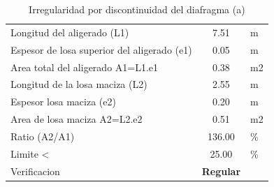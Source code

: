 \documentclass[12pt]{article}
\begin{document}
\begin{table}[h!]
  \centering
  \caption{Irregularidad por discontinuidad del diafragma (a)}
    \begin{tabular}{|ll|c|r}
\cline{1-3}    \multicolumn{2}{|l|}{Longitud del aligerado (L1)} & 7.51 & \multicolumn{1}{l}{m} \\
\cline{1-3}    \multicolumn{2}{|l|}{Espesor de losa superior del aligerado (e1)} & 0.05  & \multicolumn{1}{l}{m} \\
\cline{1-3}    \multicolumn{2}{|l|}{Area total del aligerado A1=L1.e1} & 0.38 & \multicolumn{1}{l}{m2} \\
\cline{1-3}    \multicolumn{2}{|l|}{Longitud de la losa maciza (L2)} & 2.55 & \multicolumn{1}{l}{m} \\
\cline{1-3}    \multicolumn{2}{|l|}{Espesor losa maciza (e2)} & 0.20  & \multicolumn{1}{l}{m} \\
\cline{1-3}    \multicolumn{2}{|l|}{Area de losa maciza A2=L2.e2} & 0.51 & \multicolumn{1}{l}{m2} \\
\cline{1-3}    \multicolumn{2}{|l|}{Ratio (A2/A1)} & 136.00 & \multicolumn{1}{l}{\%} \\
\cline{1-3}    \multicolumn{2}{|l|}{Limite <} & 25.00 & \multicolumn{1}{l}{\%} \\
\cline{1-3}    \multicolumn{2}{|l|}{Verificacion} & \textcolor[rgb]{ .267,  .447,  .769}{\textbf{Regular}} &  \\
\cline{1-3}    \end{tabular}%
  \label{tab:addlabel}%
\end{table}%
\end{document}
